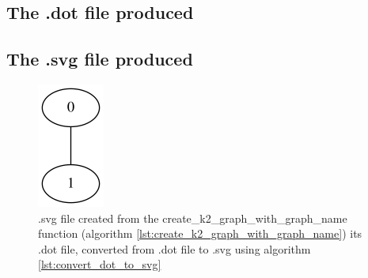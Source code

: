 \subsection{The .dot file produced}



\subsection{The .svg file produced}

\begin{figure}[!htbp]
  \includegraphics[]{create_k2_graph_with_graph_name.png}
  \caption{
    .svg file created from the create\_k2\_graph\_with\_graph\_name function (algorithm
     \ref{lst:create_k2_graph_with_graph_name}) its .dot file, 
    converted from .dot file to .svg using algorithm 
    \ref{lst:convert_dot_to_svg}  
  }
  \label{fig:create_k2_graph_with_graph_name.svg}
\end{figure}

